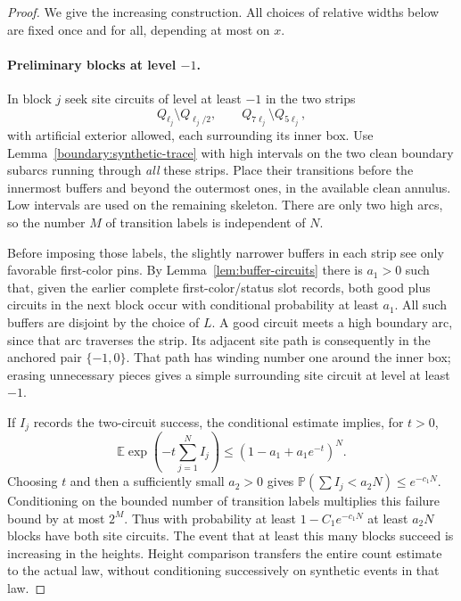 \documentclass[11pt]{article}
\theoremstyle{definition}
\theoremstyle{remark}
\numberwithin{equation}{section}
\begin{document}
\begin{proof}
We give the increasing construction.  All choices of relative widths
below are fixed once and for all, depending at most on $x$.

\paragraph{Preliminary blocks at level $-1$.}
In block $j$ seek site circuits of level at least $-1$ in the two
strips
\[
 Q_{\ell_j}\setminus Q_{\ell_j/2},
 \qquad Q_{7\ell_j}\setminus Q_{5\ell_j},
\]
with artificial exterior allowed, each surrounding its inner box.
Use Lemma~\ref{boundary:synthetic-trace} with high intervals on the
two clean boundary subarcs running through \emph{all} these strips.
Place their transitions before the innermost buffers and beyond
the outermost ones, in the available clean annulus.  Low intervals
are used on the remaining skeleton.  There are only two high arcs,
so the number $M$ of transition labels is independent of $N$.

Before imposing those labels, the slightly narrower buffers in
each strip see only favorable first-color pins.  By
Lemma~\ref{lem:buffer-circuits} there is $a_1>0$ such that, given
the earlier complete first-color/status slot records, both good
plus circuits in the next block occur with conditional probability
at least $a_1$.  All such buffers are disjoint by the choice of $L$.
A good circuit meets a high boundary arc, since that arc traverses
the strip.  Its adjacent site path is consequently in the anchored
pair $\{-1,0\}$.  That path has winding number one around the inner
box; erasing unnecessary pieces gives a simple surrounding site
circuit at level at least $-1$.

If $I_j$ records the two-circuit success, the conditional estimate
implies, for $t>0$,
\[
 \mathbb E\exp\!\left(-t\sum_{j=1}^N I_j\right)
 \le(1-a_1+a_1e^{-t})^N.
\]
Choosing $t$ and then a sufficiently small $a_2>0$ gives
$\mathbb P(\sum I_j<a_2N)\le e^{-c_1N}$.
Conditioning on the bounded number of transition labels multiplies
this failure bound by at most $2^M$.  Thus with probability at least
$1-C_1e^{-c_1N}$ at least $a_2N$ blocks have both site circuits.
The event that at least this many blocks succeed is increasing in
the heights.  Height comparison transfers the entire count estimate
to the actual law, without conditioning successively on synthetic
events in that law.


\end{proof}
\end{document}
